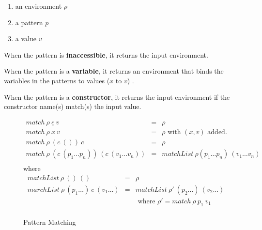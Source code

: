 \documentclass[acmsmall]{acmart}
\begin{document}
\begin{enumerate}
  \item an environment $\rho$
  \item a pattern $p$
  \item a value $v$
\end{enumerate}

When the pattern is \textbf{inaccessible}, it returns the input environment.

When the pattern is a \textbf{variable}, it returns an environment that binds the variables in the patterns to values ($x$ to $v$) .

When the pattern is a \textbf{constructor}, it returns the input environment if the constructor name(s) match(s) the input value.

\begin{figure}[H]
  \begin{equation*}
    \begin{aligned}
      match \: \rho \: \underline{e} \: v                               & = & \rho                                                 \\
      match \: \rho \: x \: v                                           & = & \rho \textrm{ with } (x, v) \textrm{ added.}         \\
      match \: \rho \: (c \: ()) \: c                                   & = & \rho                                                 \\
      match \: \rho \: (c \: (p_1 \dots p_n)) \: (c \: (v_1 \dots v_n)) & = & matchList \: \rho (p_1 \dots p_n) \: (v_1 \dots v_n) \\
    \end{aligned}
  \end{equation*}
  \textrm{ where }
  \begin{equation*}
    \begin{aligned}
      matchList \: \rho \: () \: ()                        & = & \rho                                                                               \\
      marchList \: \rho \: (p_1 \dots) \: e \: (v_1 \dots) & = & matchList \: \rho' \:(p_2 \dots) \: (v_2 \dots)                                    \\
                                                           &   & \textrm{ where } \rho'                               = match \: \rho \: p_1 \: v_1 \\     
    \end{aligned}
  \end{equation*}
  \caption{Pattern Matching}
\end{figure}
\end{document}
